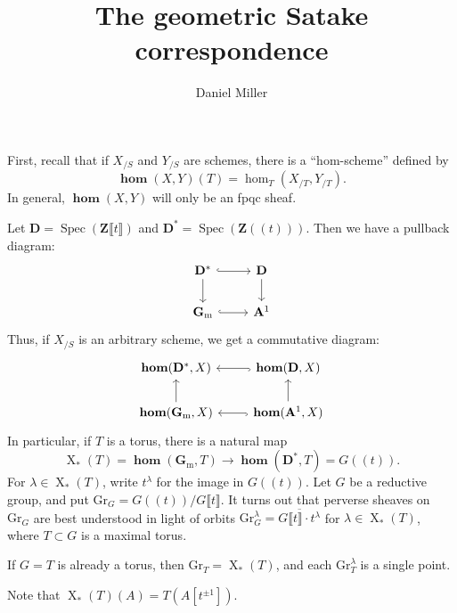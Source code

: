 \documentclass{article}
\title{The geometric Satake correspondence}
\author{Daniel Miller}
\DeclareMathOperator{\chars}{X}
\DeclareMathOperator{\Hom}{\mathbf{hom}}
\DeclareMathOperator{\spec}{Spec}
\newcommand{\bA}{\mathbf{A}}
\newcommand{\bD}{\mathbf{D}}
\newcommand{\bZ}{\mathbf{Z}}
\newcommand{\Gm}{\mathbf{G}_\mathrm{m}}
\newcommand{\Gr}{\mathrm{Gr}}
\newcommand{\lau}[1]{(\!( #1 )\! )}
\newcommand{\pow}[1]{\llbracket #1 \rrbracket}
\begin{document}
\maketitle





First, recall that if $X_{/S}$ and $Y_{/S}$ are schemes, there is a 
``hom-scheme'' defined by 
\[
	\Hom(X,Y)(T) = \hom_T(X_{/T},Y_{/T}) .
\]
In general, $\Hom(X,Y)$ will only be an fpqc sheaf. 

Let $\bD = \spec(\bZ\pow{t})$ and $\bD^\ast=\spec(\bZ\lau{t})$. Then we have a 
pullback diagram: 
\[
\begin{tikzcd}
	\bD^\ast \ar[r, hook] \ar[d]
		& \bD \ar[d] \\
	\Gm \ar[r, hook]
		& \bA^1 
\end{tikzcd}
\]
Thus, if $X_{/S}$ is an arbitrary scheme, we get a commutative diagram:
\[
\begin{tikzcd}
	\Hom(\bD^\ast,X)
		& \Hom(\bD,X) \ar[l, hook] \\
	\Hom(\Gm,X) \ar[u] 
		& \Hom(\bA^1,X) \ar[l, hook] \ar[u] 
\end{tikzcd}
\]
In particular, if $T$ is a torus, there is a natural map 
\[
	\chars_\ast(T) = \Hom(\Gm,T)\to \Hom(\bD^\ast,T) = G\lau{t} .
\]
For $\lambda\in \chars_\ast(T)$, write $t^\lambda$ for the image in 
$G\lau{t}$. Let $G$ be a reductive group, and put $\Gr_G = G\lau{t}/G\pow{t}$. 
It turns out that perverse sheaves on $\Gr_G$ are best understood in light of 
orbits $\Gr_G^\lambda = \overline{G\pow{t}\cdot t^\lambda}$ for 
$\lambda\in \chars_\ast(T)$, where $T\subset G$ is a maximal torus. 

If $G=T$ is already a torus, then $\Gr_T = \chars_\ast(T)$, and each 
$\Gr_T^\lambda$ is a single point. 

Note that $\chars_\ast(T)(A) = T(A[t^{\pm 1}])$. 
\end{document}
